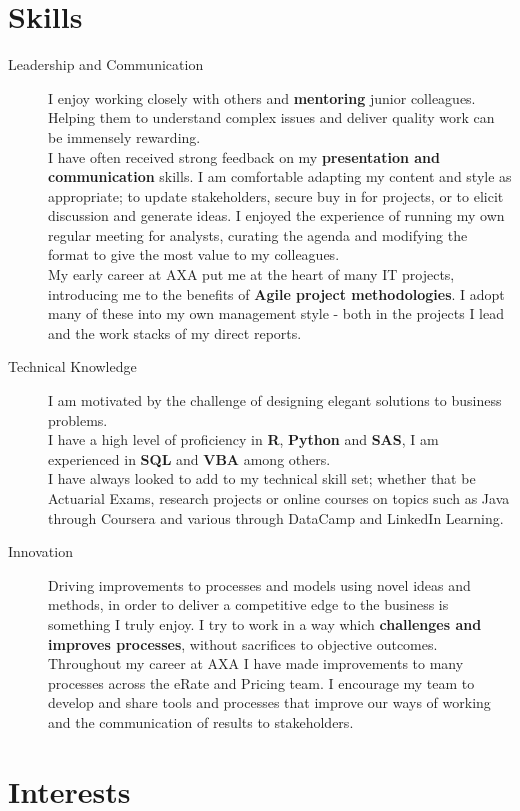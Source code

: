 \documentclass[11pt]{article}
\begin{document}
\section*{Skills}
\begin{description}
\item[Leadership and Communication] I enjoy working closely with others and \textbf{mentoring} junior colleagues. Helping them to understand complex issues and deliver quality work can be immensely rewarding. \\
I have often received strong feedback on my \textbf{presentation and communication} skills. I am comfortable adapting my content and style as appropriate; to update stakeholders, secure buy in for projects, or to elicit discussion and generate ideas.
I enjoyed the experience of running my own regular meeting for analysts, curating the agenda and modifying the format to give the most value to my colleagues.\\
My early career at AXA put me at the heart of many IT projects, introducing me to the benefits of \textbf{Agile project methodologies}. I adopt many of these into my own management  style - both in the projects I lead and the work stacks of my direct reports.
\item[Technical Knowledge] I am motivated by the challenge of designing elegant solutions to business problems. \\
I have a high level of proficiency in \textbf{R}, \textbf{Python} and \textbf{SAS}, I am experienced in \textbf{SQL} and \textbf{VBA} among others.\\
I have always looked to add to my technical skill set; whether that be Actuarial Exams, research projects or online courses on topics such as Java through Coursera and various through DataCamp and LinkedIn Learning.
\item[Innovation] Driving improvements to processes and models using novel ideas and methods, in order to deliver a competitive edge to the business is something I truly enjoy. 
I try to work in a way which \textbf{challenges and improves processes}, without sacrifices to objective outcomes.\\
Throughout my career at AXA I have made improvements to many processes across the eRate and Pricing team. I encourage my team to develop and share tools and processes that improve our ways of working and the communication of results to stakeholders.
\end{description} 

\section*{Interests}
\end{document}
